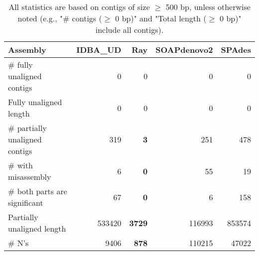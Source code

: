 \documentclass[12pt,a4paper]{article}
\begin{document}
\begin{table}[ht]
\begin{center}
\caption{All statistics are based on contigs of size $\geq$ 500 bp, unless otherwise noted (e.g., "\# contigs ($\geq$ 0 bp)" and "Total length ($\geq$ 0 bp)" include all contigs).}
\begin{tabular}{|l*{4}{|r}|}
\hline
Assembly & IDBA\_UD & Ray & SOAPdenovo2 & SPAdes \\ \hline
\# fully unaligned contigs & 0 & 0 & 0 & 0 \\ \hline
Fully unaligned length & 0 & 0 & 0 & 0 \\ \hline
\# partially unaligned contigs & 319 & {\bf 3} & 251 & 478 \\ \hline
\hspace{5mm}\# with misassembly & 6 & {\bf 0} & 55 & 19 \\ \hline
\hspace{5mm}\# both parts are significant & 67 & {\bf 0} & 6 & 158 \\ \hline
Partially unaligned length & 533420 & {\bf 3729} & 116993 & 853574 \\ \hline
\# N's & 9406 & {\bf 878} & 110215 & 47022 \\ \hline
\end{tabular}
\end{center}
\end{table}
\end{document}

